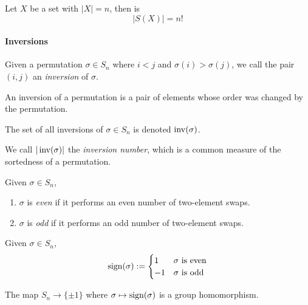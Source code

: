 \begin{proposition}[Order of \(S_n\)]
   Let \(X\) be a set with \(|X| = n\), then is
   \[|S(X)| = n!\]
\end{proposition}

\paragraph{Inversions}
\begin{definition}[Inversion]
   Given a permutation \(\sigma \in S_n\) where \(i < j\) and \(\sigma(i) > \sigma(j)\), we call the pair \((i,j)\) an \emph{inversion} of \(\sigma\).
\end{definition}
\begin{remark}[Intuition]
   An inversion of a permutation is a pair of elements whose order was changed by the permutation.
\end{remark}

\begin{definition}
   The set of all inversions of \(\sigma \in S_n\) is denoted \(\operatorname{inv}(\sigma)\).
\end{definition}
\begin{remark}[Terminology]
   We call \(|\operatorname{inv}(\sigma)|\) the \emph{inversion number}, which is a common measure of the sortedness of a permutation.
\end{remark}

\begin{definition}
   Given \(\sigma \in S_n\),
   \begin{enumerate}[label=\roman*, align=Center]
      \item \(\sigma\) is \emph{even} if it performs an even number of two-element swaps.
      \item \(\sigma\) is \emph{odd} if it performs an odd number of two-element swaps.
   \end{enumerate}
\end{definition}

\begin{definition}
   Given \(\sigma \in S_n\),
   \[\operatorname{sign}(\sigma) := \begin{cases}1 & \sigma~\text{is even}\\ -1 & \sigma~\text{is odd}\end{cases}\]
\end{definition}
\begin{remark}
   The map \(S_n \to \{\pm 1\}\) where \(\sigma \mapsto \operatorname{sign}(\sigma)\) is a group homomorphism.
\end{remark}

